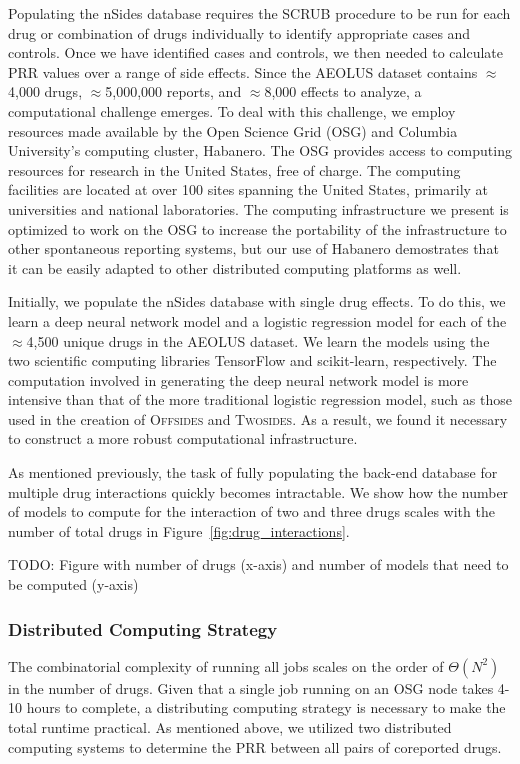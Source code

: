 \documentclass{ws-procs11x85}
\begin{document}
Populating the nSides database requires the SCRUB procedure to be run
for each drug or combination of drugs individually to identify
appropriate cases and controls. Once we have identified cases and
controls, we then needed to calculate PRR values over a range of side
effects. Since the AEOLUS dataset contains $\approx$4,000 drugs,
$\approx$5,000,000 reports, and $\approx$8,000 effects to analyze, a
computational challenge emerges.  To deal with this challenge, we
employ resources made available by the Open Science Grid (OSG) and
Columbia University's computing cluster, Habanero. The OSG provides
access to computing resources for research in the United States, free
of charge. The computing facilities are located at over 100 sites
spanning the United States, primarily at universities and national
laboratories. The computing infrastructure we present is optimized to
work on the OSG to increase the portability of the infrastructure to
other spontaneous reporting systems, but our use of Habanero
demostrates that it can be easily adapted to other distributed
computing platforms as well.

Initially, we populate the nSides database with single drug
effects. To do this, we learn a deep neural network model and a
logistic regression model for each of the $\approx$4,500 unique drugs
in the AEOLUS dataset. We learn the models using the two scientific
computing libraries TensorFlow and scikit-learn, respectively. The
computation involved in generating the deep neural network model is
more intensive than that of the more traditional logistic regression
model, such as those used in the creation of O\textsc{ffsides} and
T\textsc{wosides}. As a result, we found it necessary to construct a
more robust computational infrastructure.

As mentioned previously, the task of fully populating the back-end
database for multiple drug interactions quickly becomes
intractable. We show how the number of models to compute for the
interaction of two and three drugs scales with the number of total
drugs in Figure~\ref{fig:drug_interactions}.

TODO: Figure with number of drugs (x-axis) and number of models that need to be computed (y-axis)

\subsubsection{Distributed Computing Strategy}
The combinatorial complexity of running all jobs scales on the order
of $\Theta(N^2)$ in the number of drugs. Given that a single job
running on an OSG node takes 4-10 hours to complete, a distributing
computing strategy is necessary to make the total runtime
practical. As mentioned above, we utilized two distributed computing systems to determine
the PRR between all pairs of coreported drugs.
\end{document}
